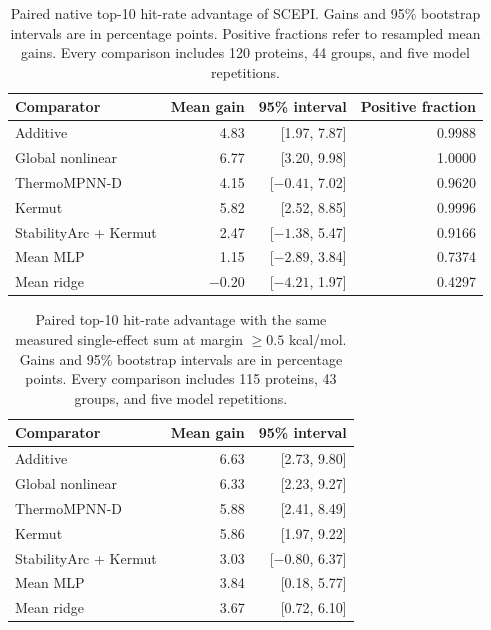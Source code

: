 \documentclass{llncs}
\begin{document}
\begin{table}[H]
\centering
\caption{Paired native top-10 hit-rate advantage of SCEPI. Gains and 95\% bootstrap intervals are in percentage points. Positive fractions refer to resampled mean gains. Every comparison includes 120 proteins, 44 groups, and five model repetitions.}
\label{tab:nativeuncertainty}
\begin{tabular}{lrrr}
\toprule
Comparator & Mean gain & 95\% interval & Positive fraction \\
\midrule
Additive & 4.83 & [1.97, 7.87] & 0.9988 \\
Global nonlinear & 6.77 & [3.20, 9.98] & 1.0000 \\
ThermoMPNN-D & 4.15 & [$-0.41$, 7.02] & 0.9620 \\
Kermut & 5.82 & [2.52, 8.85] & 0.9996 \\
StabilityArc + Kermut & 2.47 & [$-1.38$, 5.47] & 0.9166 \\
Mean MLP & 1.15 & [$-2.89$, 3.84] & 0.7374 \\
Mean ridge & $-0.20$ & [$-4.21$, 1.97] & 0.4297 \\
\bottomrule
\end{tabular}
\end{table}

\begin{table}[H]
\centering
\caption{Paired top-10 hit-rate advantage with the same measured single-effect sum at margin $\geq0.5$ kcal/mol. Gains and 95\% bootstrap intervals are in percentage points. Every comparison includes 115 proteins, 43 groups, and five model repetitions.}
\label{tab:marginuncertainty}
\begin{tabular}{lrr}
\toprule
Comparator & Mean gain & 95\% interval \\
\midrule
Additive & 6.63 & [2.73, 9.80] \\
Global nonlinear & 6.33 & [2.23, 9.27] \\
ThermoMPNN-D & 5.88 & [2.41, 8.49] \\
Kermut & 5.86 & [1.97, 9.22] \\
StabilityArc + Kermut & 3.03 & [$-0.80$, 6.37] \\
Mean MLP & 3.84 & [0.18, 5.77] \\
Mean ridge & 3.67 & [0.72, 6.10] \\
\bottomrule
\end{tabular}
\end{table}
\end{document}
